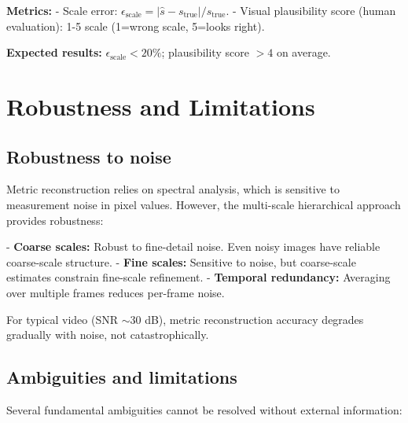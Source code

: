\documentclass[11pt,twocolumn,a4paper]{article}
\theoremstyle{definition}
\begin{document}
\textbf{Metrics:}
- Scale error: $\epsilon_{\text{scale}} = |\hat{s} - s_{\text{true}}| / s_{\text{true}}$.
- Visual plausibility score (human evaluation): 1-5 scale (1=wrong scale, 5=looks right).

\textbf{Expected results:} $\epsilon_{\text{scale}} < 20\%$; plausibility score $> 4$ on average.

\section{Robustness and Limitations}

\subsection{Robustness to noise}

Metric reconstruction relies on spectral analysis, which is sensitive to measurement noise in pixel values. However, the multi-scale hierarchical approach provides robustness:

- \textbf{Coarse scales:} Robust to fine-detail noise. Even noisy images have reliable coarse-scale structure.
- \textbf{Fine scales:} Sensitive to noise, but coarse-scale estimates constrain fine-scale refinement.
- \textbf{Temporal redundancy:} Averaging over multiple frames reduces per-frame noise.

For typical video (SNR $\sim 30$ dB), metric reconstruction accuracy degrades gradually with noise, not catastrophically.

\subsection{Ambiguities and limitations}

Several fundamental ambiguities cannot be resolved without external information:
\end{document}
